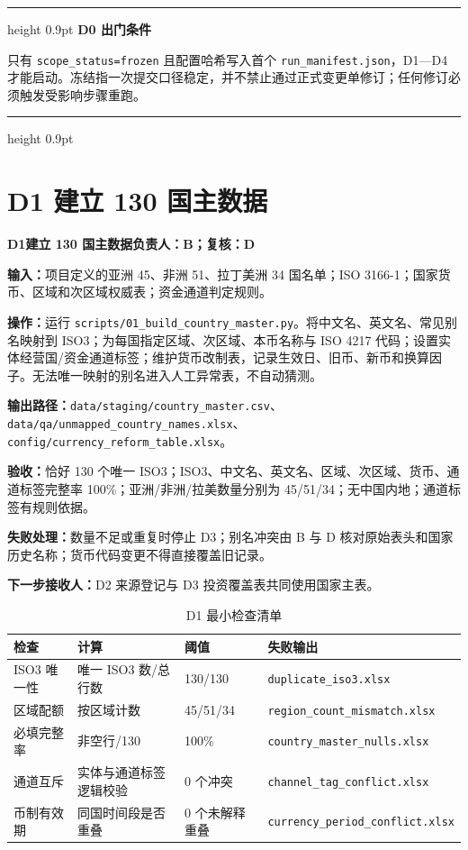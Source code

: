 \documentclass[UTF8,fontset=windows,12pt,openany]{ctexbook}
\newenvironment{gatebox}[1][]{%
  \par\medskip\noindent\begin{center}\begin{minipage}{0.93\textwidth}%
  \color{GoldLine}\hrule height 0.9pt\vspace{0.45em}%
  \textbf{#1}\par\smallskip\color{black}%
}{%
  \par\vspace{0.35em}\color{GoldLine}\hrule height 0.9pt%
  \end{minipage}\end{center}\medskip%
}
\newcommand{\Field}[1]{{\small\nolinkurl{#1}}}
\newcommand{\File}[1]{{\small\nolinkurl{#1}}}
\newcommand{\StepTitle}[3]{%
  \noindent\colorbox{DeepNavy}{\parbox{0.965\textwidth}{\color{white}\Large\bfseries #1\quad #2\hfill\normalsize #3}}\par\medskip
}
\newcommand{\CardRow}[2]{\noindent\textbf{#1：}#2\par}
\begin{document}
\begin{gatebox}[D0 出门条件]
只有 \Field{scope_status=frozen} 且配置哈希写入首个 \File{run_manifest.json}，D1—D4 才能启动。冻结指一次提交口径稳定，并不禁止通过正式变更单修订；任何修订必须触发受影响步骤重跑。
\end{gatebox}

\newpage
\section{D1 建立 130 国主数据}
\StepTitle{D1}{建立 130 国主数据}{负责人：B；复核：D}
\CardRow{输入}{项目定义的亚洲 45、非洲 51、拉丁美洲 34 国名单；ISO 3166-1；国家货币、区域和次区域权威表；资金通道判定规则。}
\CardRow{操作}{运行 \File{scripts/01_build_country_master.py}。将中文名、英文名、常见别名映射到 ISO3；为每国指定区域、次区域、本币名称与 ISO 4217 代码；设置实体经营国/资金通道标签；维护货币改制表，记录生效日、旧币、新币和换算因子。无法唯一映射的别名进入人工异常表，不自动猜测。}
\CardRow{输出路径}{\File{data/staging/country_master.csv}、\File{data/qa/unmapped_country_names.xlsx}、\File{config/currency_reform_table.xlsx}。}
\CardRow{验收}{恰好 130 个唯一 ISO3；ISO3、中文名、英文名、区域、次区域、货币、通道标签完整率 100\%；亚洲/非洲/拉美数量分别为 45/51/34；无中国内地；通道标签有规则依据。}
\CardRow{失败处理}{数量不足或重复时停止 D3；别名冲突由 B 与 D 核对原始表头和国家历史名称；货币代码变更不得直接覆盖旧记录。}
\CardRow{下一步接收人}{D2 来源登记与 D3 投资覆盖表共同使用国家主表。}

\begin{longtable}{p{3.2cm}p{3.1cm}p{3.0cm}p{4.0cm}}
\caption{D1 最小检查清单}\label{tab:d1-check}\\
\toprule
\textbf{检查} & \textbf{计算} & \textbf{阈值} & \textbf{失败输出}\\
\midrule
ISO3 唯一性 & 唯一 ISO3 数/总行数 & 130/130 & \File{duplicate_iso3.xlsx}\\
区域配额 & 按区域计数 & 45/51/34 & \File{region_count_mismatch.xlsx}\\
必填完整率 & 非空行/130 & 100\% & \File{country_master_nulls.xlsx}\\
通道互斥 & 实体与通道标签逻辑校验 & 0 个冲突 & \File{channel_tag_conflict.xlsx}\\
币制有效期 & 同国时间段是否重叠 & 0 个未解释重叠 & \File{currency_period_conflict.xlsx}\\
\bottomrule
\end{longtable}

\newpage
\end{document}
